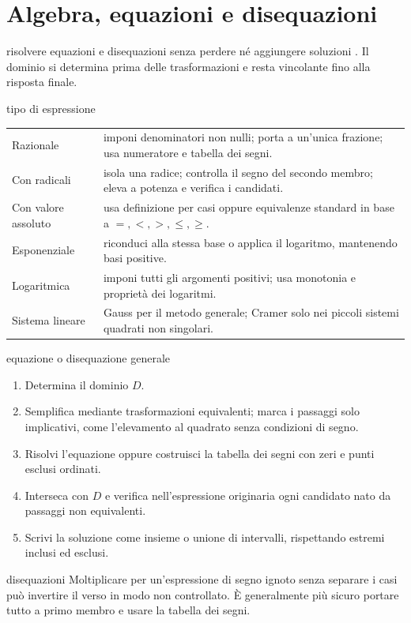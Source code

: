 \chapter{Algebra, equazioni e disequazioni}
\label{chap:2}

\begin{obiettivocapitolo}{risolvere equazioni e disequazioni senza perdere né aggiungere soluzioni}
\prioritaalta. Il dominio si determina prima delle trasformazioni e resta vincolante fino alla risposta finale.
\end{obiettivocapitolo}
\begin{sceltametodo}{tipo di espressione}
\begin{tabularx}{\textwidth}{@{}p{}X@{}}
Razionale & imponi denominatori non nulli; porta a un'unica frazione; usa numeratore e tabella dei segni.\\
Con radicali & isola una radice; controlla il segno del secondo membro; eleva a potenza e verifica i candidati.\\
Con valore assoluto & usa definizione per casi oppure equivalenze standard in base a $=,<,>,\le,\ge$.\\
Esponenziale & riconduci alla stessa base o applica il logaritmo, mantenendo basi positive.\\
Logaritmica & imponi tutti gli argomenti positivi; usa monotonia e proprietà dei logaritmi.\\
Sistema lineare & Gauss per il metodo generale; Cramer solo nei piccoli sistemi quadrati non singolari.
\end{tabularx}
\end{sceltametodo}
\begin{proceduraesame}{equazione o disequazione generale}
\begin{enumerate}
\item Determina il dominio $D$.
\item Semplifica mediante trasformazioni equivalenti; marca i passaggi solo implicativi, come l'elevamento al quadrato senza condizioni di segno.
\item Risolvi l'equazione oppure costruisci la tabella dei segni con zeri e punti esclusi ordinati.
\item Interseca con $D$ e verifica nell'espressione originaria ogni candidato nato da passaggi non equivalenti.
\item Scrivi la soluzione come insieme o unione di intervalli, rispettando estremi inclusi ed esclusi.
\end{enumerate}
\end{proceduraesame}
\begin{errorefrequente}{disequazioni}
Moltiplicare per un'espressione di segno ignoto senza separare i casi può invertire il verso in modo non controllato. È generalmente più sicuro portare tutto a primo membro e usare la tabella dei segni.
\end{errorefrequente}

